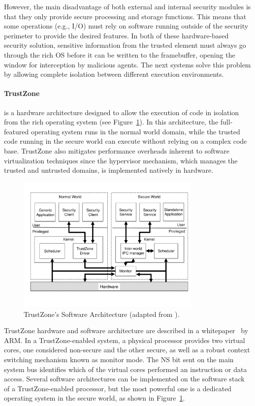 However, the main disadvantage of both external and internal security modules is that they only provide secure processing and storage functions. This means that some operations (e.g., I/O) must rely on software running outside of the security perimeter to provide the desired features. In both of these hardware-based security solution, sensitive information from the trusted element must always go through the rich OS before it can be written to the framebuffer, opening the window for interception by malicious agents. The next systems solve this problem by allowing complete isolation between different execution environments.

\paragraph{\textbf{TrustZone}} is a hardware architecture designed to allow the execution of code in isolation from the rich operating system (see Figure~\ref{fig:trustzone_architecture}). In this architecture, the full-featured operating system runs in the normal world domain, while the trusted code running in the secure world can execute without relying on a complex code base. TrustZone also mitigates performance overheads inherent to software virtualization techniques since the hypervisor mechanism, which manages the trusted and untrusted domains, is implemented natively in hardware.

\begin{figure}[t!]
	\centering
	\includegraphics[width=0.80\textwidth]{img/trustzone.pdf}
	\caption{TrustZone's Software Architecture (adapted from \cite{trustzone_whitepaper}).}
	\label{fig:trustzone_architecture}
\end{figure}

TrustZone hardware and software architecture are described in a whitepaper~\cite{trustzone_whitepaper} by ARM. In a TrustZone-enabled system, a physical processor provides two virtual cores, one considered non-secure and the other secure, as well as a robust context switching mechanism known as monitor mode. The NS bit sent on the main system bus identifies which of the virtual cores performed an instruction or data access. Several software architectures can be implemented on the software stack of a TrustZone-enabled processor, but the most powerful one is a dedicated operating system in the secure world, as shown in Figure~\ref{fig:trustzone_architecture}.

